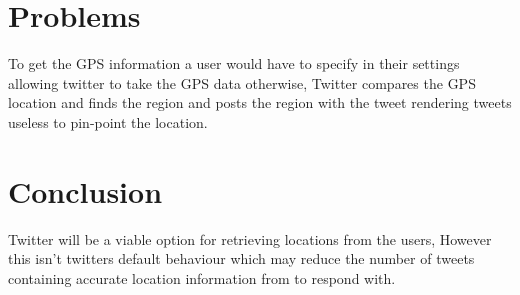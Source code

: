 \documentclass{article}
\begin{document}
\section{Problems}
To get the GPS information a user would have to specify in their settings allowing twitter to take the GPS data otherwise, Twitter compares the GPS location and finds the region and posts the region with the tweet rendering tweets useless to pin-point the location.

\section{Conclusion}
Twitter will be a viable option for retrieving locations from the users, However this isn't twitters default behaviour which may reduce the number of tweets containing accurate location information from to respond with.
\end{document}
